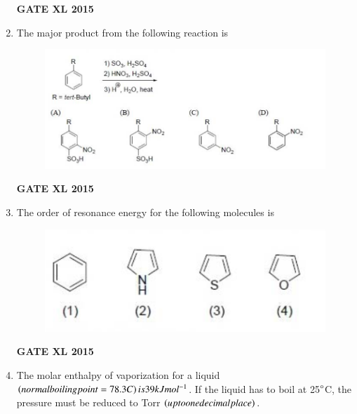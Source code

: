 \documentclass[journal,12pt,onecolumn]{IEEEtran}
\begin{document}
\begin{enumerate}
\begin{figure}[h!]
		    \caption*{}
		\label{fig:Q21}
	\end{figure}
\begin{flushright}\textbf{GATE XL 2015}\end{flushright}
\item The major product from the following reaction is
    
	\begin{figure}[h!]
    \includegraphics[width=15cm]{22}
		    \caption*{}
		\label{fig:Q22}
	\end{figure}
\begin{flushright}\textbf{GATE XL 2015}\end{flushright}
\item The order of resonance energy for the following molecules is
    
	\begin{figure}[h!]
    \includegraphics{23}
		    \caption*{}
		\label{fig:Q23}
	\end{figure}

	\begin{enumerate}
    \end{enumerate}
\begin{flushright}\textbf{GATE XL 2015}\end{flushright}
\item The molar enthalpy of vaporization for a liquid $\left(normal boiling point = 78.3 C\right) is 39 kJ mol^{-1}$. If the liquid has to boil at 25$\degree$C, the pressure must be reduced to Torr $\left(up to one decimal place\right)$.


\end{enumerate}
\end{document}
